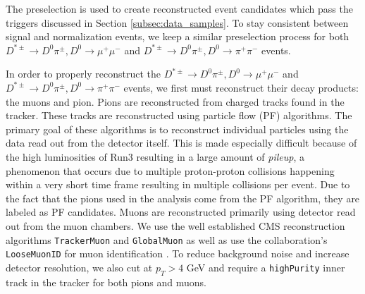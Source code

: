 The preselection is used to create reconstructed event candidates which pass the triggers discussed in Section \ref{subsec:data_samples}. To stay consistent between signal and normalization events, we keep a similar preselection process for both $D^{*\pm} \to D^0 \pi^\pm, D^0 \to \mu^+ \mu^-$ and $D^{*\pm} \to D^0 \pi^\pm, D^0 \to \pi^+ \pi^-$ events.

In order to properly reconstruct the $D^{*\pm} \to D^0 \pi^\pm, D^0 \to \mu^+ \mu^-$ and $D^{*\pm} \to D^0 \pi^\pm, D^0 \to \pi^+ \pi^-$ events, we first must reconstruct their decay products: the muons and pion. Pions are reconstructed from charged tracks found in the tracker. These tracks are reconstructed using particle flow (PF) algorithms. The primary goal of these algorithms is to reconstruct individual particles using the data read out from the detector itself. This is made especially difficult because of the high luminosities of Run3 resulting in a large amount of \textit{pileup}, a phenomenon that occurs due to multiple proton-proton collisions happening within a very short time frame resulting in multiple collisions per event. Due to the fact that the pions used in the analysis come from the PF algorithm, they are labeled as PF candidates. Muons are reconstructed primarily using detector read out from the muon chambers. We use the well established CMS reconstruction algorithms \texttt{TrackerMuon} and \texttt{GlobalMuon} as well as use the collaboration's \texttt{LooseMuonID} for muon identification \cite{ref:sirunyan_2018}. To reduce background noise and increase detector resolution, we also cut at $p_T>4$ GeV and require a \texttt{highPurity} inner track in the tracker for both pions and muons.

